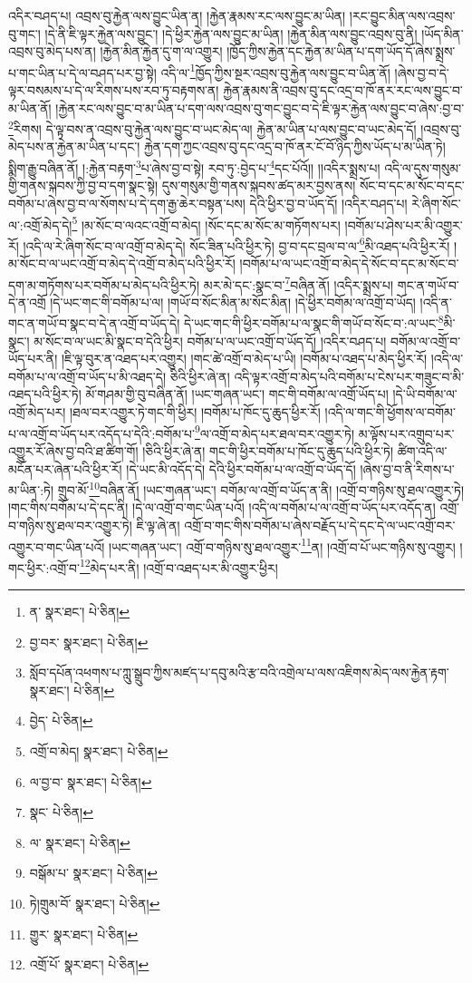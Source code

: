 འདིར་བཤད་པ། འབྲས་བུ་རྐྱེན་ལས་བྱུང་ཡིན་ན། །རྐྱེན་རྣམས་རང་ལས་བྱུང་མ་ཡིན། །རང་བྱུང་མིན་ལས་འབྲས་བུ་གང་། །དེ་ནི་ཇི་ལྟར་རྐྱེན་ལས་བྱུང་། །དེ་ཕྱིར་རྐྱེན་ལས་བྱུང་མ་ཡིན། །རྐྱེན་མིན་ལས་བྱུང་འབྲས་བུ་ནི། །ཡོད་མིན་འབྲས་བུ་མེད་པས་ན། །རྐྱེན་མིན་རྐྱེན་དུ་ག་ལ་འགྱུར། །ཁྱོད་ཀྱིས་རྐྱེན་དང་རྐྱེན་མ་ཡིན་པ་དག་ཡོད་དོ་ཞེས་སྨྲས་པ་གང་ཡིན་པ་དེ་ལ་བཤད་པར་བྱ་སྟེ། འདི་ལ་\footnote{ན་  སྣར་ཐང་།  པེ་ཅིན། }ཁྱོད་ཀྱིས་སྔར་འབྲས་བུ་རྐྱེན་ལས་བྱུང་བ་ཡིན་ནོ། །ཞེས་བྱ་བ་དེ་ལྟར་བསམས་པ་དེ་ལ་རིགས་པས་རབ་ཏུ་བརྟགས་ན། རྐྱེན་རྣམས་ནི་འབྲས་བུ་དང་འདྲ་བ་ཁོ་ནར་རང་ལས་བྱུང་བ་མ་ཡིན་ནོ། །རྐྱེན་རང་ལས་བྱུང་བ་མ་ཡིན་པ་དག་ལས་འབྲས་བུ་གང་བྱུང་བ་དེ་ཇི་ལྟར་རྐྱེན་ལས་བྱུང་བ་ཞེས་:བྱ་བ་\footnote{བྱ་བར་  སྣར་ཐང་།  པེ་ཅིན། }རིགས། དེ་ལྟ་བས་ན་འབྲས་བུ་རྐྱེན་ལས་བྱུང་བ་ཡང་མེད་ལ། རྐྱེན་མ་ཡིན་པ་ལས་བྱུང་བ་ཡང་མེད་དོ། །འབྲས་བུ་མེད་པས་ན་རྐྱེན་མ་ཡིན་པ་དང་། རྐྱེན་དག་ཀྱང་འབྲས་བུ་དང་འདྲ་བ་ཁོ་ནར་ངོ་བོ་ཉིད་ཀྱིས་ཡོད་པ་མ་ཡིན་ཏེ། སྨིག་རྒྱུ་བཞིན་ནོ། །:རྐྱེན་བརྟག་\footnote{སློབ་དཔོན་འཕགས་པ་ཀླུ་སྒྲུབ་ཀྱིས་མཛད་པ་དབུ་མའི་རྩ་བའི་འགྲེལ་པ་ལས་འཇིགས་མེད་ལས་རྐྱེན་རྟག་  སྣར་ཐང་།  པེ་ཅིན། }པ་ཞེས་བྱ་བ་སྟེ། རབ་ཏུ་:བྱེད་པ་\footnote{བྱེད་  པེ་ཅིན། }དང་པོའོ།། །།འདིར་སྨྲས་པ། འདི་ལ་དུས་གསུམ་གྱི་གནས་སྐབས་ཀྱི་བྱ་བ་དག་སྣང་སྟེ། དུས་གསུམ་གྱི་གནས་སྐབས་ཚད་མར་བྱས་ནས། སོང་བ་དང་མ་སོང་བ་དང་བགོམ་པ་ཞེས་བྱ་བ་ལ་སོགས་པ་དེ་དག་རྒྱ་ཆེར་བསྟན་པས། དེའི་ཕྱིར་བྱ་བ་ཡོད་དོ། །འདིར་བཤད་པ། རེ་ཞིག་སོང་ལ་:འགྲོ་མེད་དེ།\footnote{འགྲོ་བ་མེད།  སྣར་ཐང་།  པེ་ཅིན། } །མ་སོང་བ་ལའང་འགྲོ་བ་མེད། །སོང་དང་མ་སོང་མ་གཏོགས་པར། །བགོམ་པ་ཤེས་པར་མི་འགྱུར་རོ། །འདི་ལ་རེ་ཞིག་སོང་བ་ལ་འགྲོ་བ་མེད་དེ། སོང་ཟིན་པའི་ཕྱིར་ཏེ། བྱ་བ་དང་བྲལ་བ་ལ་\footnote{ལ་བྱ་བ་  སྣར་ཐང་།  པེ་ཅིན། }མི་འཐད་པའི་ཕྱིར་རོ། །མ་སོང་བ་ལ་ཡང་འགྲོ་བ་མེད་དེ་འགྲོ་བ་མེད་པའི་ཕྱིར་རོ། །བགོམ་པ་ལ་ཡང་འགྲོ་བ་མེད་དེ་སོང་བ་དང་མ་སོང་བ་དག་མ་གཏོགས་པར་བགོམ་པ་མེད་པའི་ཕྱིར་ཏེ། མར་མེ་དང་:སྣང་བ་\footnote{སྣང་  པེ་ཅིན། }བཞིན་ནོ། །འདིར་སྨྲས་པ། གང་ན་གཡོ་བ་དེ་ན་འགྲོ །དེ་ཡང་གང་གི་བགོམ་པ་ལ། །གཡོ་བ་སོང་མིན་མ་སོང་མིན། །དེ་ཕྱིར་བགོམ་ལ་འགྲོ་བ་ཡོད། །འདི་ན་གང་ན་གཡོ་བ་སྣང་བ་དེ་ན་འགྲོ་བ་ཡོད་དེ། དེ་ཡང་གང་གི་ཕྱིར་བགོམ་པ་ལ་སྣང་གི་གཡོ་བ་སོང་བ་:ལ་ཡང་\footnote{ལ་  སྣར་ཐང་།  པེ་ཅིན། }མི་སྣང་། མ་སོང་བ་ལ་ཡང་མི་སྣང་བ་དེའི་ཕྱིར། བགོམ་པ་ལ་ཡང་འགྲོ་བ་ཡོད་དོ། །འདིར་བཤད་པ། བགོམ་ལ་འགྲོ་བ་ཡོད་པར་ནི། །ཇི་ལྟ་བུར་ན་འཐད་པར་འགྱུར། །གང་ཚེ་འགྲོ་བ་མེད་པ་ཡི། །བགོམ་པ་འཐད་པ་མེད་ཕྱིར་རོ། །འདི་ལ་བགོམ་པ་ལ་འགྲོ་བ་ཡོད་པ་མི་འཐད་དེ། ཅིའི་ཕྱིར་ཞེ་ན། འདི་ལྟར་འགྲོ་བ་མེད་པའི་བགོམ་པ་ངེས་པར་གཟུང་བ་མི་འཐད་པའི་ཕྱིར་ཏེ། མོ་གཤམ་གྱི་བུ་བཞིན་ནོ། །ཡང་གཞན་ཡང་། གང་གི་བགོམ་ལ་འགྲོ་ཡོད་པ། །དེ་ཡི་བགོམ་ལ་འགྲོ་མེད་པར། །ཐལ་བར་འགྱུར་ཏེ་གང་གི་ཕྱིར། །བགོམ་པ་ཁོང་དུ་ཆུད་ཕྱིར་རོ། །འདི་ལ་གང་གི་ཕྱོགས་ལ་བགོམ་པ་ལ་འགྲོ་བ་ཡོད་པར་འདོད་པ་དེའི་:བགོམ་པ་\footnote{བསྒོམ་པ་  སྣར་ཐང་།  པེ་ཅིན། }ལ་འགྲོ་བ་མེད་པར་ཐལ་བར་འགྱུར་ཏེ། མ་ལྟོས་པར་འགྲུབ་པར་འགྱུར་རོ་ཞེས་བྱ་བའི་ཐ་ཚིག་གོ། །ཅིའི་ཕྱིར་ཞེ་ན། གང་གི་ཕྱིར་བགོམ་པ་ཁོང་དུ་ཆུད་པའི་ཕྱིར་ཏེ། ཚིག་འདི་ལ་མངོན་པར་ཞེན་པའི་ཕྱིར་རོ། །དེ་ཡང་མི་འདོད་དེ། དེའི་ཕྱིར་བགོམ་པ་ལ་འགྲོ་བ་ཡོད་དོ། །ཞེས་བྱ་བ་ནི་རིགས་པ་མ་ཡིན་:ཏེ། གྲུབ་མོ་\footnote{ཏེ།གྲུམ་བོ་  སྣར་ཐང་།  པེ་ཅིན། }བཞིན་ནོ། །ཡང་གཞན་ཡང་། བགོམ་ལ་འགྲོ་བ་ཡོད་ན་ནི། །འགྲོ་བ་གཉིས་སུ་ཐལ་འགྱུར་ཏེ། །གང་གིས་བགོམ་པ་དེ་དང་ནི། །དེ་ལ་འགྲོ་བ་གང་ཡིན་པའོ། །འདི་ལ་བགོམ་པ་ལ་འགྲོ་བ་ཡོད་པར་འདོད་ན། འགྲོ་བ་གཉིས་སུ་ཐལ་བར་འགྱུར་ཏེ། ཇི་ལྟ་ཞེ་ན། འགྲོ་བ་གང་གིས་བགོམ་པ་ཞེས་བརྗོད་པ་དེ་དང་དེ་ལ་ཡང་འགྲོ་བར་འགྱུར་བ་གང་ཡིན་པའོ། །ཡང་གཞན་ཡང་། འགྲོ་བ་གཉིས་སུ་ཐལ་འགྱུར་\footnote{གྱུར་  སྣར་ཐང་།  པེ་ཅིན། }ན། །འགྲོ་བ་པོ་ཡང་གཉིས་སུ་འགྱུར། །གང་ཕྱིར་:འགྲོ་བ་\footnote{འགྲོ་པོ་  སྣར་ཐང་།  པེ་ཅིན། }མེད་པར་ནི། །འགྲོ་བ་འཐད་པར་མི་འགྱུར་ཕྱིར། 